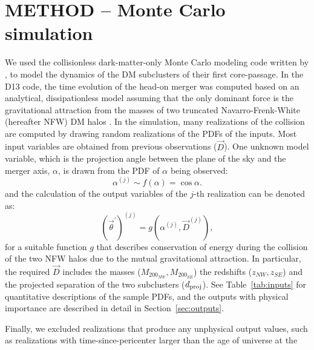\documentclass[letterpaper,useAMS,usenatbib]{mn2e}
\begin{document}
\section{METHOD -- Monte Carlo simulation} 
We used the collisionless 
dark-matter-only Monte Carlo modeling code written by , to
model the dynamics of the DM subclusters of their first core-passage.
In the D13 code, the time evolution of the
head-on merger was computed based on an analytical, dissipationless model
assuming that the only dominant force is the gravitational attraction from
the masses of two truncated Navarro-Frenk-White (hereafter NFW) DM halos
\citep{Navarro96}. 
In the simulation, many realizations of the collision are
computed by drawing random realizations of the PDFs of the inputs. Most
input variables are obtained from previous observations ($\vec{D}$).  One
unknown model variable, which is the projection angle between the plane of the sky
and the merger axis, $\alpha$, is drawn from the PDF of $\alpha$ being
observed: 
\begin{equation}
	\alpha^{(j)} \sim f(\alpha) = \cos \alpha.
\end{equation}
and the calculation of the output variables of the $j$-th realization can be denoted as: 
\begin{equation}
	(\vec{\theta}^\prime)^{(j)} = g(\alpha^{(j)}, \vec{D}^{(j)}), 
\end{equation}    
for a suitable function $g$ that describes conservation of energy during
the collision of the two NFW halos due to the mutual gravitational
attraction.  In particular, the required $\vec{D}$ includes the masses ($M_{200_{NW}},M_{200_{SE}}$) the redshifts ($z_{NW}, z_{SE}$) and the
projected separation of the two subclusters ($d_{\rm proj}$).  See
Table~\ref{tab:inputs} for quantitative descriptions of the sample PDFs, and
the outputs with physical importance are described in detail in Section~\ref{sec:outputs}. \par
Finally, we excluded realizations that produce any unphysical output
values, such as realizations with time-since-pericenter larger than the age of universe at the
\end{document}

